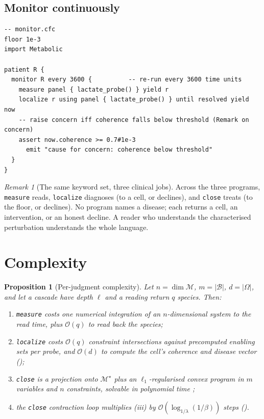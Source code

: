 \documentclass[11pt,a4paper]{article}
\theoremstyle{cfcthm}
\newtheorem{proposition}[theorem]{Proposition}
\theoremstyle{definition}
\theoremstyle{remark}
\newtheorem{remark}[theorem]{Remark}
\newcommand{\Man}{\mathcal{M}}          %
\newcommand{\Coh}{\Man^{\star}}         %
\newcommand{\flo}{\beta}                %
\newcommand{\basis}{\mathcal{B}}        %
\newcommand{\Dom}{\Omega}               %
\newcommand{\abs}[1]{\lvert#1\rvert}
\newcommand{\cf}[1]{\texttt{#1}}
\begin{document}
\subsection{Monitor continuously}

\begin{lstlisting}[caption={A continuously working probe re-reads the state.}]
-- monitor.cfc
floor 1e-3
import Metabolic

patient R {
  monitor R every 3600 {          -- re-run every 3600 time units
    measure panel { lactate_probe() } yield r
    localize r using panel { lactate_probe() } until resolved yield now
    -- raise concern iff coherence falls below threshold (Remark on concern)
    assert now.coherence >= 0.7#1e-3
      emit "cause for concern: coherence below threshold"
  }
}
\end{lstlisting}

\begin{remark}[The same keyword set, three clinical jobs]
\label{rem:three-jobs}
Across the three programs, \cf{measure} reads, \cf{localize} diagnoses (to a
cell, or declines), and \cf{close} treats (to the floor, or declines). No
program names a disease; each returns a cell, an intervention, or an honest
decline. A reader who understands the characterised perturbation understands
the whole language.
\end{remark}

\section{Complexity}
\label{sec:complexity}

\begin{proposition}[Per-judgment complexity]
\label{prop:complexity}
Let $n=\dim\Man$, $m=\abs{\basis}$, $d=\abs{\Dom}$, and let a cascade have
depth $\ell$ and a reading return $q$ species. Then:
\begin{enumerate}[label=\textup{(\roman*)},leftmargin=2.2em,itemsep=2pt]
\item \cf{measure} costs one numerical integration of an $n$-dimensional system
to the read time, plus $\mathcal{O}(q)$ to read back the species;
\item \cf{localize} costs $\mathcal{O}(q)$ constraint intersections against
precomputed enabling sets per probe, and $\mathcal{O}(d)$ to compute the cell's
coherence and disease vector ();
\item \cf{close} is a projection onto $\Coh$ plus an $\ell_1$-regularised convex
program in $m$ variables and $n$ constraints, solvable in polynomial time
\citep{boyd2004convex};
\item the \cf{close} contraction loop multiplies (iii) by
$\mathcal{O}(\log_{1/\lambda}(1/\flo))$ steps ().
\end{enumerate}
\end{proposition}
\end{document}
